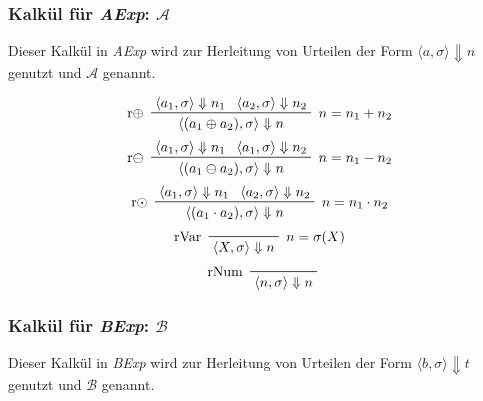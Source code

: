 \documentclass[a4paper, 11pt, accentcolor = tud3b]{tudreport}
\begin{document}
			    \subsubsection{Kalkül für \textit{AExp}: $ \mathcal{A} $}
					Dieser Kalkül in \textit{AExp} wird zur Herleitung von Urteilen der Form $ \langle a, \sigma \rangle \Downarrow n $ genutzt und $ \mathcal{A} $ genannt.

				    \begin{multicols}{2}
					    \begin{equation*}
						    \prftree[l, r]
							    { $ n = n _ 1 + n _ 2 $ }
							    { r$ \oplus $ }
							    { \langle a _ 1, \sigma \rangle \Downarrow n _ 1 }
							    { \langle a _ 2, \sigma \rangle \Downarrow n _ 2 }
							    { \langle (a _ 1 \oplus a _ 2), \sigma \rangle \Downarrow n }
					    \end{equation*}
					    \begin{equation*}
							\prftree[l, r]
								{ $ n = n _ 1 - n _ 2 $ }
								{ r$ \ominus $ }
								{ \langle a _ 1, \sigma \rangle \Downarrow n _ 1 }
								{ \langle a _ 1, \sigma \rangle \Downarrow n _ 2 }
								{ \langle (a _ 1 \ominus a _ 2), \sigma \rangle \Downarrow n }
					    \end{equation*}
					    \begin{equation*}
						    \prftree[l, r]
							    { $ n = n _ 1 \cdot n _ 2 $ }
							    { r$ \odot $ }
							    { \langle a _ 1, \sigma \rangle \Downarrow n _ 1 }
							    { \langle a _ 2, \sigma \rangle \Downarrow n _ 2 }
							    { \langle (a _ 1 \cdot a _ 2), \sigma \rangle \Downarrow n }
					    \end{equation*}
					    \begin{equation*}
						    \prftree[l, r]
							    { $ n  = \sigma(X) $ }
							    { rVar }
							    { \langle X, \sigma \rangle \Downarrow n }
					    \end{equation*}
					    \begin{equation*}
						    \prftree[l]
							    { rNum }
							    { \langle n, \sigma \rangle \Downarrow n }
					    \end{equation*}
				    \end{multicols}
			    
			    \subsubsection{Kalkül für \textit{BExp}: $ \mathcal{B} $}
				    Dieser Kalkül in \textit{BExp} wird zur Herleitung von Urteilen der Form $ \langle b, \sigma \rangle \Downarrow t $ genutzt und $ \mathcal{B} $ genannt.
			    
\end{document}
